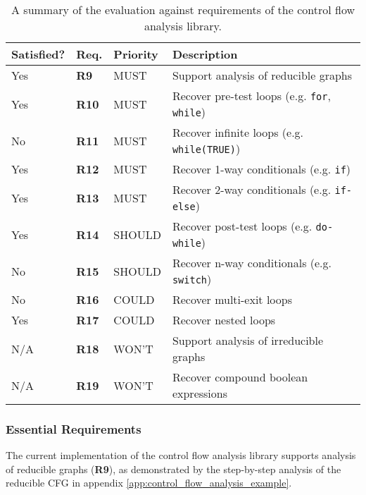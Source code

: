 \begin{table}[htbp]
	\begin{center}
		\begin{tabular}{|l|l|l|l|}
			\hline
			Satisfied? & Req. & Priority & Description \\
			\hline
			Yes & \textbf{R9} & MUST & Support analysis of reducible graphs \\
			Yes & \textbf{R10} & MUST & Recover pre-test loops (e.g. \texttt{for}, \texttt{while}) \\
			No & \textbf{R11} & MUST & Recover infinite loops (e.g. \texttt{while(TRUE)}) \\
			Yes & \textbf{R12} & MUST & Recover 1-way conditionals (e.g. \texttt{if}) \\
			Yes & \textbf{R13} & MUST & Recover 2-way conditionals (e.g. \texttt{if-else}) \\
			Yes & \textbf{R14} & SHOULD & Recover post-test loops (e.g. \texttt{do-while}) \\
			No & \textbf{R15} & SHOULD & Recover n-way conditionals (e.g. \texttt{switch}) \\
			No & \textbf{R16} & COULD & Recover multi-exit loops \\
			Yes & \textbf{R17} & COULD & Recover nested loops \\
			N/A & \textbf{R18} & WON'T & Support analysis of irreducible graphs \\
			N/A & \textbf{R19} & WON'T & Recover compound boolean expressions \\
			\hline
		\end{tabular}
	\end{center}
	\caption{A summary of the evaluation against requirements of the control flow analysis library.}
	\label{tbl:eval_summary_of_control_flow_analysis_library}
\end{table}


\subsubsection{Essential Requirements}
\label{sec:eval_control_flow_analysis_library_essential_requirements}

The current implementation of the control flow analysis library supports analysis of reducible graphs (\textbf{R9}), as demonstrated by the step-by-step analysis of the reducible CFG in appendix \ref{app:control_flow_analysis_example}.

